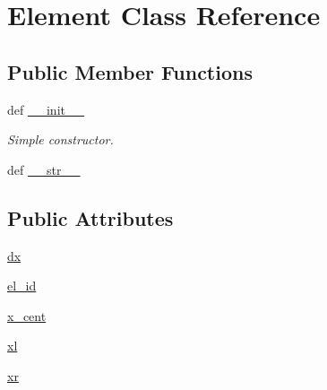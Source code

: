 \hypertarget{classsrc_1_1_mesh_1_1_element}{\section{Element Class Reference}
\label{classsrc_1_1_mesh_1_1_element}
}
\subsection*{Public Member Functions}
\begin{DoxyCompactItemize}
\item 
def \hyperlink{classsrc_1_1_mesh_1_1_element_ac775ee34451fdfa742b318538164070e}{\-\_\-\-\_\-init\-\_\-\-\_\-}
\begin{DoxyCompactList}\small\item\em Simple constructor. \end{DoxyCompactList}\item 
def \hyperlink{classsrc_1_1_mesh_1_1_element_aa7a4b9bc0941308e362738503137460e}{\-\_\-\-\_\-str\-\_\-\-\_\-}
\end{DoxyCompactItemize}
\subsection*{Public Attributes}
\begin{DoxyCompactItemize}
\item 
\hyperlink{classsrc_1_1_mesh_1_1_element_aacddc911cdfe5cd5ec97b084754542d4}{dx}
\item 
\hyperlink{classsrc_1_1_mesh_1_1_element_ae6d1f7a1542ce73d6d9913c97961d5ea}{el\-\_\-id}
\item 
\hyperlink{classsrc_1_1_mesh_1_1_element_accf6c197a418ed2d049c5648d9c71a9e}{x\-\_\-cent}
\item 
\hyperlink{classsrc_1_1_mesh_1_1_element_a3c53fbdcb4e4034433f7fb548430436d}{xl}
\item 
\hyperlink{classsrc_1_1_mesh_1_1_element_a67ac9cf4961c762581641460beb3d936}{xr}
\end{DoxyCompactItemize}


